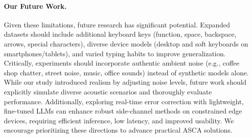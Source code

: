 \paragraph{Our Future Work.}
Given these limitations, future research has significant potential. Expanded datasets should include additional keyboard keys (function, space, backspace, arrows, special characters), diverse device models (desktop and soft keyboards on smartphones/tablets), and varied typing habits to improve generalization. Critically, experiments should incorporate authentic ambient noise (e.g., coffee shop chatter, street noise, music, office sounds) instead of synthetic models alone. While our study introduced realism by adjusting noise levels, future work should explicitly simulate diverse acoustic scenarios and thoroughly evaluate performance. Additionally, exploring real-time error correction with lightweight, fine-tuned LLMs can enhance robust side-channel methods on constrained edge devices, requiring efficient inference, low latency, and improved usability. We encourage prioritizing these directions to advance practical ASCA solutions.

